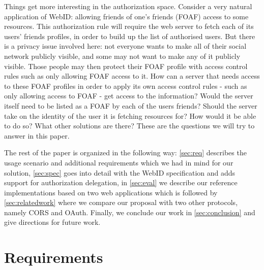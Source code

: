 \documentclass[a4paper]{llncs}
\begin{document}
Things get more interesting in the authorization space.
Consider a very natural application of WebID: allowing friends of one's friends (FOAF) access to some resources.
This authorization rule will require the web server to fetch each of its users' friends profiles, in order to build up the list of authorised users.
But there is a privacy issue involved here: not everyone wants to make all of their social network publicly visible, and some may not want to make any of it publicly visible.
Those people may then protect their FOAF profile with access control rules such as only allowing FOAF access to it.
How can a server that needs access to these FOAF profiles in order to apply its own access control rules - such as only allowing access to FOAF - get access to the information? 
Would the server itself need to be listed as a FOAF by each of the users friends?
Should the server take on the identity of the user it is fetching resources for? 
How would it be able to do so?
What other solutions are there?
These are the questions we will try to answer in this paper.

The rest of the paper is organized in the following way:
\autoref{sec:req} describes the usage scenario and additional requirements which we had in mind for our solution,
\autoref{sec:spec} goes into detail with the WebID specification and adds support for authorization delegation,
in \autoref{sec:eval} we describe our reference implementations based on two web applications which is followed by \autoref{sec:relatedwork} where we compare our proposal with two other protocols, namely CORS and OAuth.
Finally, we conclude our work in \autoref{sec:conclusion} and give directions for future work.


\section{Requirements}\label{sec:req}

\end{document}
